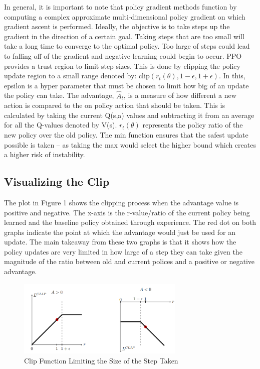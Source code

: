 \documentclass[10pt,twocolumn]{article}
\begin{document}
In general, it is important to note that policy gradient methods function by computing a complex
approximate multi-dimensional policy gradient on which gradient ascent is performed. Ideally,
the objective is to take steps up the gradient in the direction of a certain goal. Taking steps that
are too small will take a long time to converge to the optimal policy. Too large of steps could
lead to falling off of the gradient and negative learning could begin to occur. PPO provides a trust region to limit step sizes. This is done by clipping the policy update region to a small range
denoted by: $\textrm{clip}\left ( r_{t}(\theta), 1-\epsilon, 1 + \epsilon \right )$. In this, epsilon is a hyper parameter that must be chosen to limit how big of an update the policy can take. The advantage, $\hat{A}_{t}$, is a measure of how
different a new action is compared to the on policy action that should be taken. This is calculated
by taking the current Q(s,a) values and subtracting it from an average for all the Q-values
denoted by V(s). $r_{t}(\theta)$ represents the policy ratio of the new policy over the old policy. The
min function ensures that the safest update possible is taken – as taking the max would select the
higher bound which creates a higher risk of instability.

\subsection{Visualizing the Clip}

The plot in Figure 1 shows the clipping process when the advantage value is positive and negative.
The x-axis is the r-value/ratio of the current policy being learned and the baseline policy obtained
through experience. The red dot on both graphs indicate the point at which the advantage would
just be used for an update. The main takeaway from these two graphs is that it shows how the policy updates are very limited in how large of a step they can take given the magnitude of the
ratio between old and current polices and a positive or negative advantage.


\begin{figure}
    \centering
    \includegraphics[width=80mm,scale=1]{PPO Clip.png}
    
    \caption{Clip Function Limiting the Size of the Step Taken \cite{DBLP:journals/corr/SchulmanWDRK17}}
    \label{fig:my_label}
\end{figure}
\end{document}
